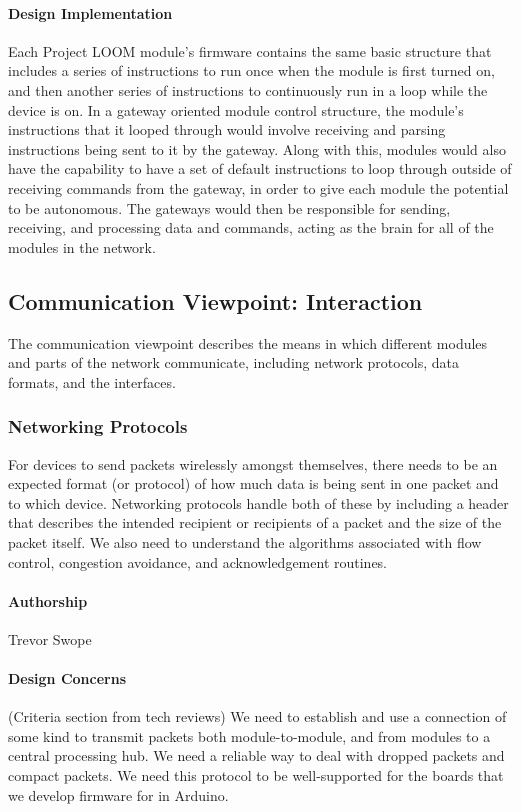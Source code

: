 \documentclass[onecolumn, draftclsnofoot,10pt, compsoc]{IEEEtran}
\begin{document}
\paragraph{Design Implementation}
Each Project LOOM module's firmware contains the same basic structure that includes a series of instructions to run once when the module is first turned on, and then another series of instructions to continuously run in a loop while the device is on. In a gateway oriented module control structure, the module's instructions that it looped through would involve receiving and parsing instructions being sent to it by the gateway. Along with this, modules would also have the capability to have a set of default instructions to loop through outside of receiving commands from the gateway, in order to give each module the potential to be autonomous. The gateways would then be responsible for sending, receiving, and processing data and commands, acting as the brain for all of the modules in the network. 






\subsection{Communication Viewpoint: Interaction}
The communication viewpoint describes the means in which different modules and parts of the network communicate, including network protocols, data formats, and the interfaces.

\subsubsection{Networking Protocols}
For devices to send packets wirelessly amongst themselves, there needs to be an expected format (or protocol) of how much data is being sent in one packet and to which device. Networking protocols handle both of these by including a header that describes the intended recipient or recipients of a packet and the size of the packet itself. We also need to understand the algorithms associated with flow control, congestion avoidance, and acknowledgement routines.

\paragraph{Authorship}
Trevor Swope

\paragraph{Design Concerns} (Criteria section from tech reviews)
We need to establish and use a connection of some kind to transmit packets both module-to-module, and from modules to a central processing hub. We need a reliable way to deal with dropped packets and compact packets. We need this protocol to be well-supported for the boards that we develop firmware for in Arduino.
\end{document}
